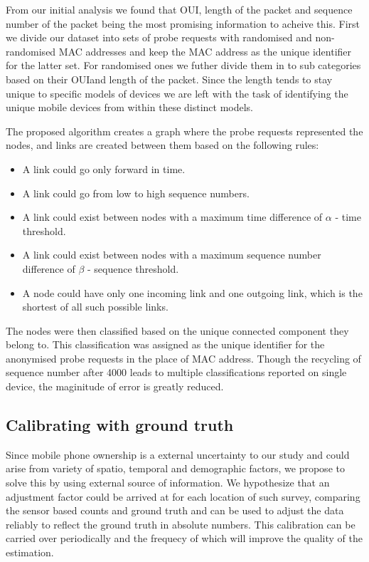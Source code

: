 From our initial analysis we found that OUI, length of the packet and sequence number of the packet being the most promising information to acheive this.
First we divide our dataset into sets of probe requests with randomised and non-randomised MAC addresses and keep the MAC address as the unique identifier for the latter set. 
For randomised ones we futher divide them in to sub categories based on their OUIand length of the packet.
Since the length tends to stay unique to specific models of devices we are left with the task of identifying the unique mobile devices from within these distinct models.

The proposed algorithm creates a graph where the probe requests represented the nodes, and links are created between them based on the following rules: 
\begin{itemize}
	\item A link could go only forward in time. 
	\item A link could go from low to high sequence numbers.
	\item A link could exist between nodes with a maximum time difference of $\alpha$ - time threshold.
	\item A link could exist between nodes with a maximum sequence number difference of $\beta$ - sequence threshold.
	\item A node could have only one incoming link and one outgoing link, which is the shortest of all such possible links.
\end{itemize}
The nodes were then classified based on the unique connected component they belong to.
This classification was assigned as the unique identifier for the anonymised probe requests in the place of MAC address.
Though the recycling of sequence number after 4000 leads to multiple classifications reported on single device, the maginitude of error is greatly reduced. 

\subsection{Calibrating with ground truth}
Since mobile phone ownership is a external uncertainty to our study and could arise from variety of spatio, temporal and demographic factors, we propose to solve this by using external source of information. We hypothesize that an adjustment factor could be arrived at for each location of such survey, comparing the sensor based counts and ground truth and can be used to adjust the data reliably to reflect the ground truth in absolute numbers. This calibration can be carried over periodically and the frequecy of which will improve the quality of the estimation.
